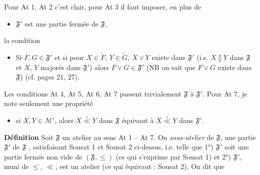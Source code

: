 \documentclass[11pt,a4paper]{article}
\begin{document}
Pour At 1, At 2 c'est clair, pour At 3 il faut  imposer, en plus de

\begin{itemize}
  \item[Sousat 1] $\mathfrak{F}'$ est une partie fermée  de $\mathfrak{F}$,
\end{itemize}
la condition
\begin{itemize}
  \item[Sousat 2] Si $F, G \in \mathfrak{F}'$ et si pour  $X \in \widetilde{F}$, $Y \in \widetilde{G}$, $X \vee Y$ existe dans $\mathfrak{F}'$ (i.e.  $X \between Y$ dans $\mathfrak{F}$ et  $X$, $Y$ majorés dans $\mathfrak{F}'$) alors $F \vee G \in \mathfrak{F}'$ (NB on sait que $F \vee G$ existe dans $\mathfrak{F}$) (cf. pages 21, 27).
\end{itemize}


Les conditions At 4, At 5, At 6, At 7 passent  trivialement  $\mathfrak{F}$ à $\mathfrak{F}'$. Pour At 7, je note seulement une propriété
\begin{itemize}
  \item[\uncertain{(*)}] si $X, Y \in \mathcal{M}'$, alors $X \overset{\circ}{\ll} Y$ dans $\mathfrak{F}$ équivaut à $X \overset{\circ}{\ll} Y$ dans $\mathfrak{F}'$.
\end{itemize}


\textbf{Définition} Soit $\mathfrak{F}$ un atelier au sens At 1 -- At 7. On  \emph{sous-atelier} de $\mathfrak{F}$, une partie $\mathfrak{F}'$ de $\mathfrak{F}$ \struck{\ill{}}, satisfaisant Sousat 1 et Sousat 2 ci-dessus, i.e. telle que 1°) $\mathfrak{F}'$ soit une partie fermée non vide de $(\mathfrak{F}, \leq)$  (ce qui s'exprime par Sousat 1) et 2°) $\mathfrak{F}'$, muni de $\leq$, $\ll$, est un atelier (ce qui équivaut : Sousat 2). On dit que
\end{document}
